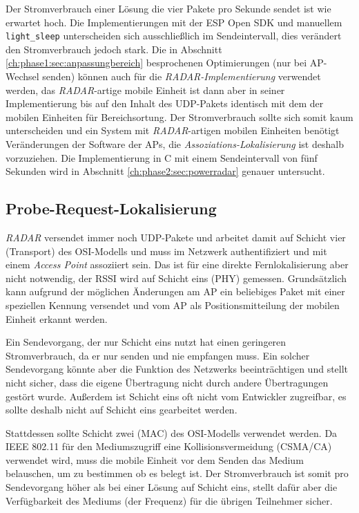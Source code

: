 Der Stromverbrauch einer Lösung die vier Pakete pro Sekunde sendet ist wie erwartet hoch.
Die Implementierungen mit der ESP Open SDK und manuellem \texttt{light\_sleep} unterscheiden sich ausschließlich im Sendeintervall, dies verändert den Stromverbrauch jedoch stark.
Die in Abschnitt \ref{ch:phase1:sec:anpassungbereich} besprochenen Optimierungen (nur bei AP-Wechsel senden) können auch für die \emph{RADAR-Implementierung} verwendet werden, das \emph{RADAR}-artige mobile Einheit ist dann aber in seiner Implementierung bis auf den Inhalt des UDP-Pakets identisch mit dem der mobilen Einheiten für Bereichsortung.
Der Stromverbrauch sollte sich somit kaum unterscheiden und ein System mit \emph{RADAR}-artigen mobilen Einheiten benötigt Veränderungen der Software der APs, die \emph{Assoziations-Lokalisierung} ist deshalb vorzuziehen. 
Die Implementierung in C mit einem Sendeintervall von fünf Sekunden wird in Abschnitt \ref{ch:phase2:sec:powerradar} genauer untersucht.

\subsection{Probe-Request-Lokalisierung}
\label{ch:phase2:sec:anpassungbereich}
\emph{RADAR} versendet immer noch UDP-Pakete und arbeitet damit auf Schicht vier (Transport) des OSI-Modells und muss im Netzwerk authentifiziert und mit einem \emph{Access Point} assoziiert sein.
Das ist für eine direkte Fernlokalisierung aber nicht notwendig, der RSSI wird auf Schicht eins (PHY) gemessen.
Grundsätzlich kann aufgrund der möglichen Änderungen am AP ein beliebiges Paket mit einer speziellen Kennung versendet und vom AP als Positionsmitteilung der mobilen Einheit erkannt werden. 

Ein Sendevorgang, der nur Schicht eins nutzt hat einen geringeren Stromverbrauch, da er nur senden und nie empfangen muss.
Ein solcher Sendevorgang könnte aber die Funktion des Netzwerks beeinträchtigen und stellt nicht sicher, dass die eigene Übertragung nicht durch andere Übertragungen gestört wurde.
Außerdem ist Schicht eins oft nicht vom Entwickler zugreifbar, es sollte deshalb nicht auf Schicht eins gearbeitet werden.

Stattdessen sollte Schicht zwei (MAC) des OSI-Modells verwendet werden. 
Da IEEE 802.11 für den Mediumszugriff eine Kollisionsvermeidung (CSMA/CA) verwendet wird, muss die mobile Einheit vor dem Senden das Medium belauschen, um zu bestimmen ob es belegt ist.
Der Stromverbrauch ist somit pro Sendevorgang höher als bei einer Lösung auf Schicht eins, stellt dafür aber die Verfügbarkeit des Mediums (der Frequenz) für die übrigen Teilnehmer sicher. 

